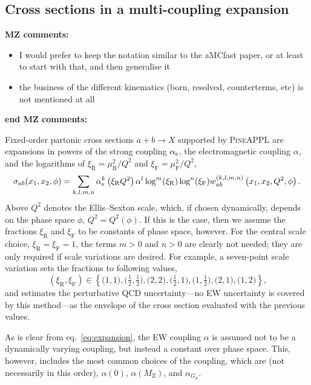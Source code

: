 \subsection{Cross sections in a multi-coupling expansion}
\label{sec:multi-coupling-expansion}
{\bf MZ comments:}
\begin{itemize}
    \item I would prefer to keep the notation similar to the aMCfast paper, or at least to start with that, and then generalise it
    \item the business of the different kinematics (born, resolved, counterterms, etc) is not mentioned at all
\end{itemize}
{\bf end MZ comments:}

Fixed-order partonic cross sections $a + b \to X$ supported by \textsc{PineAPPL} are expansions in powers of the strong coupling $\alpha_\mathrm{s}$, the electromagnetic coupling $\alpha$, and the logarithms of $\xi_\mathrm{R} = \mu_\mathrm{R}^2 / Q^2$ and $\xi_\mathrm{F} = \mu_\mathrm{F}^2 / Q^2$,
\begin{equation}
\sigma_{ab} (x_1, x_2, \phi) = \sum_{k,l,m,n} \alpha_\mathrm{s}^k \left( \xi_\mathrm{R} Q^2 \right) \alpha^l \log^m ( \xi_\mathrm{R} ) \log^n ( \xi_\mathrm{F} ) w_{ab}^{(k,l,m,n)} \left( x_1, x_2, Q^2, \phi \right) \text{.}
\label{eq:expansion}
\end{equation}
Above $Q^2$ denotes the Ellis--Sexton scale, which, if chosen dynamically, depends on the phase space $\phi$, $Q^2 = Q^2 (\phi)$.
If this is the case, then we assume the fractions $\xi_\mathrm{R}$ and $\xi_\mathrm{F}$ to be constants of phase space, however.
For the central scale choice, $\xi_\mathrm{R} = \xi_\mathrm{F} = 1$, the terms $m > 0$ and $n > 0$ are clearly not needed; they are only required if scale variations are desired.
For example, a seven-point scale variation sets the fractions to following values,
\begin{equation}
(\xi_\mathrm{R}, \xi_\mathrm{F}) \in \left\{ \bigl( 1, 1 \bigr), \bigl( \tfrac{1}{2}, \tfrac{1}{2} \bigr), \bigl( 2, 2 \bigr), \bigl( \tfrac{1}{2}, 1 \bigr), \bigl( 1, \tfrac{1}{2} \bigr), \bigl( 2, 1 \bigr), \bigl( 1, 2 \bigr) \right\} \text{,}
\end{equation}
and estimates the perturbative QCD uncertainty---no EW uncertainty is covered by this method---as the envelope of the cross section evaluated with the previous values.

As is clear from eq.~\eqref{eq:expansion}, the EW coupling $\alpha$ is assumed not to be a dynamically varying coupling, but instead a constant over phase space.
This, however, includes the most common choices of the coupling, which are (not necessarily in this order), $\alpha (0)$, $\alpha (M_\mathrm{Z})$, and $\alpha_{G_\mu}$.

